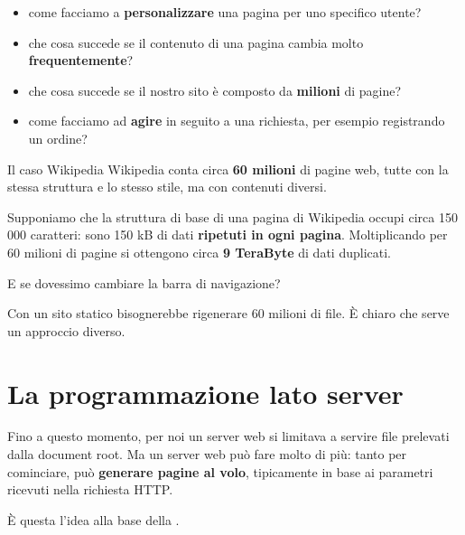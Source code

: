 \begin{itemize}
  \item come facciamo a \textbf{personalizzare} una pagina per uno specifico
        utente?
  \item che cosa succede se il contenuto di una pagina cambia molto
        \textbf{frequentemente}?
  \item che cosa succede se il nostro sito è composto da \textbf{milioni} di
        pagine?
  \item come facciamo ad \textbf{agire} in seguito a una richiesta, per esempio
        registrando un ordine?
\end{itemize}

\begin{esempio}{Il caso Wikipedia}
Wikipedia conta circa \textbf{60 milioni} di pagine web, tutte con la stessa
struttura e lo stesso stile, ma con contenuti diversi.

Supponiamo che la struttura di base di una pagina di Wikipedia occupi circa
150\,000 caratteri: sono 150 kB di dati \textbf{ripetuti in ogni pagina}.
Moltiplicando per 60 milioni di pagine si ottengono circa \textbf{9 TeraByte} di
dati duplicati.

E se dovessimo cambiare la barra di navigazione?

Con un sito statico bisognerebbe rigenerare 60 milioni di file. È chiaro che
serve un approccio diverso.
\end{esempio}

\section{La programmazione lato server}

Fino a questo momento, per noi un server web si limitava a servire file
prelevati dalla document root. Ma un server web può fare molto di più: tanto per
cominciare, può \textbf{generare pagine al volo}, tipicamente in base ai
parametri ricevuti nella richiesta HTTP.

È questa l'idea alla base della .

